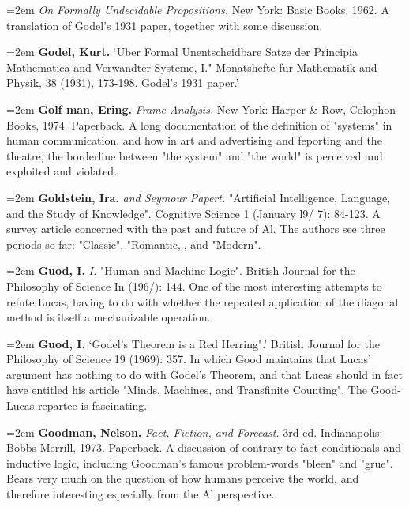 \par\noindent\hangindent=2em  {\it On Formally Undecidable Propositions.} New York: Basic Books, 1962. A translation of Godel's 1931 paper, together with some discussion.

\par\noindent\hangindent=2em {\bf Godel, Kurt.} `Uber Formal Unentscheidbare Satze der Principia Mathematica and Verwandter Systeme, I." Monatshefte fur Mathematik and Physik, 38 (1931), 173-198. Godel's 1931 paper.' 

\par\noindent\hangindent=2em {\bf Golf man, Ering.} {\it Frame Analysis.} New York: Harper \& Row, Colophon Books, 1974. Paperback. A long documentation of the definition of "systems" in human communication, and how in art and advertising and feporting and the theatre, the borderline between "the system" and "the world" is perceived and exploited and violated.

\par\noindent\hangindent=2em {\bf Goldstein, Ira.} {\it and Seymour Papert.} "Artificial Intelligence, Language, and the Study of Knowledge". Cognitive Science 1 (January l9/ 7): 84-123. A survey article concerned with the past and future of Al. The authors see three periods so far: "Classic", "Romantic,., and "Modern".

\par\noindent\hangindent=2em {\bf Guod, I.} {\it I.} "Human and Machine Logic". British Journal for the Philosophy of Science In (196/): 144. One of the most interesting attempts to refute Lucas, having to do with whether the repeated application of the diagonal method is itself a mechanizable operation.

\par\noindent\hangindent=2em {\bf Guod, I.} `Godel's Theorem is a Red Herring".' British Journal for the Philosophy of Science 19 (1969): 357. In which Good maintains that Lucas' argument has nothing to do with Godel's Theorem, and that Lucas should in fact have entitled his article "Minds, Machines, and Transfinite Counting". The Good-Lucas repartee is fascinating.

\par\noindent\hangindent=2em {\bf Goodman, Nelson.} {\it Fact, Fiction, and Forecast.} 3rd ed. Indianapolis: Bobbs-Merrill, 1973. Paperback. A discussion of contrary-to-fact conditionals and inductive logic, including Goodman's famous problem-words "bleen" and "grue". Bears very much on the question of how humans perceive the world, and therefore interesting especially from the Al perspective.

